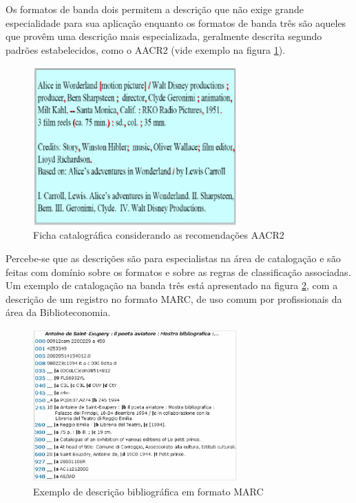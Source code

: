 Os formatos de banda dois permitem a descrição que não exige grande especialidade para sua aplicação enquanto os formatos de banda três são aqueles que provêm uma descrição mais especializada, geralmente descrita segundo padrões estabelecidos, como o AACR2 (vide exemplo na figura \ref{fig:aacr2}). 

\graphicspath{{figuras/}}
\begin{figure}[H]
\centering
\includegraphics[width=0.7\textwidth]{aacr2}
\caption{Ficha catalográfica considerando as recomendações AACR2}
\label{fig:aacr2}
\end{figure}

Percebe-se que as descrições são para especialistas na área de catalogação e são feitas com domínio sobre os formatos e sobre as regras de classificação associadas. Um exemplo de catalogação na banda três está apresentado na figura \ref{fig:marc2}, com a descrição de um registro no formato MARC, de uso comum por profissionais da área da Biblioteconomia.

\graphicspath{{figuras/}}
\begin{figure}[H]
\centering
\includegraphics[width=0.7\textwidth]{marc2}
\caption{Exemplo de descrição bibliográfica em formato MARC}
\label{fig:marc2}
\end{figure}

